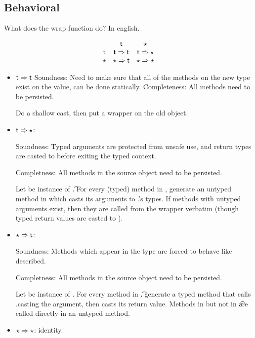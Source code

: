 \documentclass[a4paper,UKenglish,final]{lipics}
\begin{document}
\subsection{Behavioral}



\hrulefill

\begin{mathpar}
\end{mathpar}

What does the wrap function do? In english.

\[
\begin{array}{ccc}
& \t & \any \\
\t & \t \Rightarrow \t & \t \Rightarrow \any \\
\any & \any \Rightarrow \t & \any \Rightarrow \any \\
\end{array}
\]

\begin{itemize}
\item $\t \Rightarrow \t$
  Soundness: Need to make sure that all of the methods on the new type exist on the value, can be done statically.
  Completeness: All methods need to be persisted.

  Do a shallow cast, then put a wrapper on the old object.
\item $\t \Rightarrow \any$:

Soundness: Typed arguments are protected from unsafe use, and return types are casted to \any before exiting the typed context.

Completness: All methods in the source object need to be persisted.

Let \C be instance of \t. For every (typed) method \m in \C, generate an untyped method \m in \D which casts its arguments to \C.\m's types. If methods with untyped arguments exist, then they are called from the wrapper verbatim (though typed return values are casted to \any).

\item $\any \Rightarrow \t$:

Soundness: Methods which appear in the type are forced to behave like described. 

Completness: All methods in the source object need to be persisted.

Let \C be instance of \any. For every method \m in \t, generate a typed method that calls \C.\m casting the argument, then casts its return value. Methods \m in \C but not in \t are called directly in an untyped method.

\item $\any \Rightarrow \any$: identity.
\end{itemize}
\end{document}
